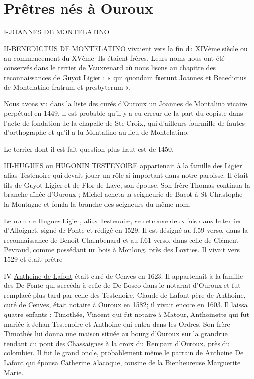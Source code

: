 \chapter{Prêtres nés à Ouroux}

I-\underline{JOANNES DE MONTELATINO}

II-\underline{BENEDICTUS DE MONTELATINO} vivaient vers la fin du XIVème siècle ou au commencement du XVème. Ils étaient frères. Leurs noms nous ont été conservés dans le terrier de Vauxrenard où nous lisons au chapitre des reconnaissances de Guyot Ligier : « qui quondam fuerunt Joannes et Benedictus de Montelatino fratrum et presbyterum ».

Nous avons vu dans la liste des curés d'Ouroux un Joannes de Montalino vicaire perpétuel en 1449. Il est probable qu'il y a eu erreur de la part du copiste dans l'acte de fondation de la chapelle de Ste Croix, qui d'ailleurs fourmille de fautes d'orthographe et qu'il a lu Montalino au lieu de Montelatino.

Le terrier dont il est fait question plus haut est de 1450.

III-\underline{HUGUES ou HUGONIN TESTENOIRE} appartenait à la famille des Ligier alias Testenoire qui devait jouer un rôle si important dans notre paroisse. Il était fils de Guyot Ligier et de Flor de Laye, son épouse. Son frère Thomas continua la branche aînée d'Ouroux ; Michel acheta la seigneurie de Bacot à St-Christophe-la-Montagne et fonda la branche des seigneurs du même nom.

Le nom de Hugues Ligier, alias Testenoire, se retrouve deux fois dans le terrier d'Alloignet, signé de Fonte et rédigé en 1529. Il est désigné au f.59 verso, dans la reconnaissance de Benoît Chambenard et au f.61 verso, dans celle de Clément Peyraud, comme possédant un bois à Monlong, près des Loyttes. Il vivait vers 1529 et était prêtre.

IV-\underline{Anthoine de Lafont} était curé de Cenves en 1623. Il appartenait à la famille des De Fonte qui succéda à celle de De Bosco dans le notariat d'Ouroux et fut remplacé plus tard par celle des Testenoire.
    Claude de Lafont père de Anthoine, curé de Cenves, était notaire à Ouroux en 1582; il vivait encore en 1603. Il laissa quatre enfants : Timothée, Vincent qui fut notaire à Matour, Anthoinette qui fut mariée à Jehan Testenoire et Anthoine qui entra dans les Ordres. Son frère Timothée lui donna une maison située au bourg d'Ouroux sur la grandrue tendant du pont des Chassaignes à la croix du Rempart d'Ouroux, près du colombier. Il fut le grand oncle, probablement même le parrain de Anthoine De Lafont qui épousa Catherine Alacoque, cousine de la Bienheureuse Marguerite Marie.

